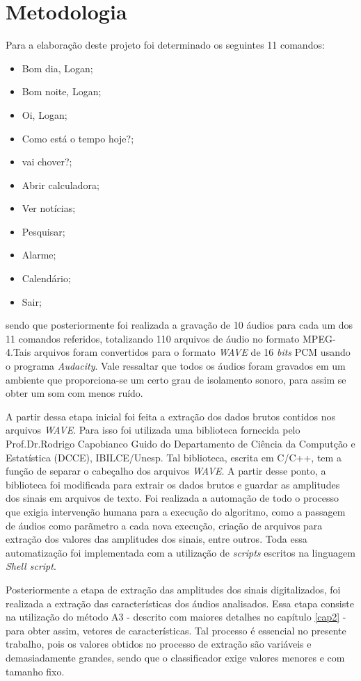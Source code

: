 \documentclass[a4paper,12pt,twoside,openright]{report}
\begin{document}
\section{Metodologia}
\par Para a elabora\c{c}\~{a}o deste projeto foi determinado os seguintes 11 comandos:
\begin{itemize}
	\item{}Bom dia, Logan;
	\item{}Bom noite, Logan;
	\item{}Oi, Logan;
	\item{}Como est\'{a} o tempo hoje?;
	\item{}vai chover?;
	\item{}Abrir calculadora;
	\item{}Ver not\'{i}cias;
	\item{}Pesquisar;
	\item{}Alarme;
	\item{}Calend\'{a}rio;
	\item{}Sair;	
\end{itemize}
sendo que posteriormente foi realizada a grava\c{c}\~{a}o de 10 \'{a}udios para cada um dos 11 comandos referidos, totalizando 110 arquivos de \'{a}udio no formato MPEG-4.Tais arquivos foram convertidos para o formato \textit{WAVE} de 16 \textit{bits} PCM usando o programa \textit{Audacity}. Vale ressaltar que todos os \'{a}udios foram gravados em um ambiente que proporciona-se um certo grau de isolamento sonoro, para assim se obter um som com menos ru\'{i}do.
\par A partir dessa etapa inicial foi feita a extra\c{c}\~{a}o dos dados brutos contidos nos arquivos \textit{WAVE}. Para isso foi utilizada uma biblioteca fornecida pelo Prof.Dr.Rodrigo Capobianco Guido do Departamento de Ci\^{e}ncia da Comput{\c c}\~{a}o e Estat\'{i}stica (DCCE), IBILCE/Unesp. Tal biblioteca, escrita em C/C++, tem a fun\c{c}\~{a}o de separar o cabe{\c c}alho dos arquivos \textit{WAVE}. A partir desse ponto, a biblioteca foi modificada para extrair os dados brutos e guardar as amplitudes dos sinais em arquivos de texto. Foi realizada a automa{\c c}\~{a}o de todo o processo que exigia interven{\c c}\~{a}o humana para a execu{\c c}\~{a}o do algoritmo, como a passagem  de \'{a}udios como par\~{a}metro a cada nova execu{\c c}\~{a}o, cria{\c c}\~{a}o de arquivos para extra{\c c}\~{a}o dos valores das amplitudes dos sinais, entre outros. Toda essa automatiza{\c c}\~{a}o foi implementada com a utiliza{\c c}\~{a}o de \textit{scripts} escritos na linguagem \textit{Shell script}.
\par Posteriormente a etapa de extra{\c c}\~{a}o das amplitudes dos sinais digitalizados, foi realizada a extra{\c c}\~{a}o das caracter\'{i}sticas dos \'{a}udios analisados. Essa etapa consiste na utiliza{\c c}\~{a}o do m\'{e}todo A3 - descrito com maiores detalhes no cap\'{i}tulo \ref{cap2} - para obter assim, vetores de caracter\'{i}sticas. Tal processo \'{e} essencial no presente trabalho, pois os valores obtidos no processo de extra{\c c}\~{a}o s\~{a}o vari\'{a}veis e demasiadamente grandes, sendo que o classificador exige valores menores e com tamanho fixo.
\end{document}
